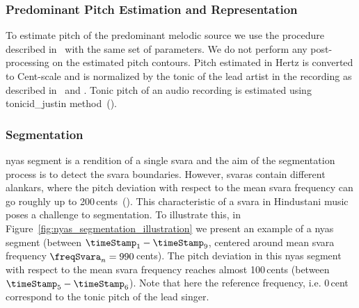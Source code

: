 {\subsubsection{Predominant Pitch Estimation and Representation}

To estimate pitch of the predominant melodic source we use the procedure described in~ with the same set of parameters. We do not perform any post-processing on the estimated pitch contours. Pitch estimated in Hertz is converted to Cent-scale and is normalized by the tonic of the lead artist in the recording as described in~ and . Tonic pitch of an audio recording is estimated using \acrshort{tonicid_justin} method~(). 


\subsubsection{Segmentation}
\label{sec:nyas_svara_segmentation_method}

\Gls{nyas} segment is a rendition of a single \gls{svara} and the aim of the segmentation process is to detect the \gls{svara} boundaries. However, \glspl{svara} contain different \glspl{alankar}, where the pitch deviation with respect to the mean \gls{svara} frequency can go roughly up to 200\,cents~(). This characteristic of a \gls{svara} in Hindustani music poses a challenge to segmentation. To illustrate this, in Figure~\ref{fig:nyas_segmentation_illustration} we present an example of a \gls{nyas} segment (between $\timeStamp_1-\timeStamp_9$, centered around mean \gls{svara} frequency $\freqSvara_n=990$\,cents). The pitch deviation in this \gls{nyas} segment with respect to the mean \gls{svara} frequency reaches almost 100\,cents (between $\timeStamp_5-\timeStamp_6$). Note that here the reference frequency, i.e. 0\,cent correspond to the tonic pitch of the lead singer.

}

